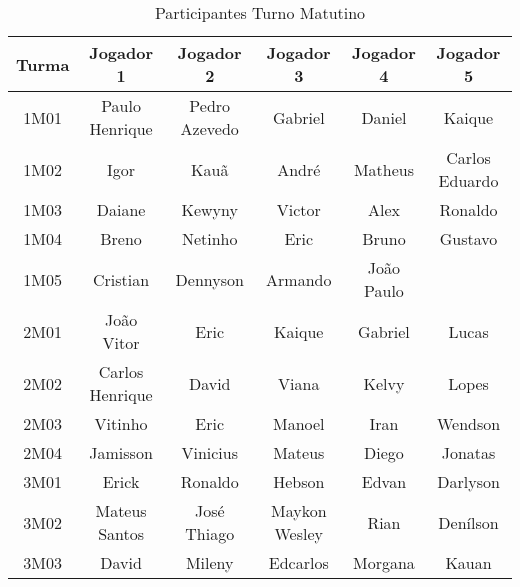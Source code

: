 \documentclass[10pt]{article}
\begin{document}
    \pagebreak

    \begin{table}[h!]
        \caption{Participantes Turno Matutino}
        \label{tab:part-matutino}
        \begin{center}
            \begin{tabular}{c|c|c|c|c|c}
                \hline
                \textbf{Turma} & \textbf{Jogador 1} & \textbf{Jogador 2} & \textbf{Jogador 3} & \textbf{Jogador 4} & \textbf{Jogador 5}\\ \hline
                1M01 & Paulo Henrique & Pedro Azevedo & Gabriel & Daniel & Kaique\\
                1M02 & Igor & Kauã & André & Matheus & Carlos Eduardo \\
                1M03 & Daiane & Kewyny & Victor & Alex & Ronaldo \\
                1M04 & Breno & Netinho & Eric & Bruno & Gustavo \\
                1M05 & Cristian & Dennyson & Armando & João Paulo & \\
                2M01 & João Vitor & Eric & Kaique & Gabriel & Lucas \\
                2M02 & Carlos Henrique & David & Viana & Kelvy & Lopes \\
                2M03 & Vitinho & Eric & Manoel & Iran & Wendson \\
                2M04 & Jamisson & Vinicius & Mateus & Diego & Jonatas \\
                3M01 & Erick & Ronaldo & Hebson & Edvan & Darlyson \\
                3M02 & Mateus Santos & José Thiago & Maykon Wesley & Rian & Denílson \\
                3M03 & David & Mileny & Edcarlos & Morgana & Kauan \\
                \hline
            \end{tabular}
        \end{center}
    \end{table}
\end{document}
